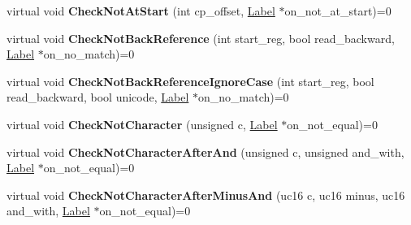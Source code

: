 \begin{DoxyCompactItemize}
\item 
virtual void {\bfseries Check\+Not\+At\+Start} (int cp\+\_\+offset, \hyperlink{classv8_1_1internal_1_1_label}{Label} $\ast$on\+\_\+not\+\_\+at\+\_\+start)=0\hypertarget{classv8_1_1internal_1_1_reg_exp_macro_assembler_a12b0a00f2d90487e6eccc9559f45a104}{}\label{classv8_1_1internal_1_1_reg_exp_macro_assembler_a12b0a00f2d90487e6eccc9559f45a104}

\item 
virtual void {\bfseries Check\+Not\+Back\+Reference} (int start\+\_\+reg, bool read\+\_\+backward, \hyperlink{classv8_1_1internal_1_1_label}{Label} $\ast$on\+\_\+no\+\_\+match)=0\hypertarget{classv8_1_1internal_1_1_reg_exp_macro_assembler_a3f57a3263201ff4724ee6504a079d72a}{}\label{classv8_1_1internal_1_1_reg_exp_macro_assembler_a3f57a3263201ff4724ee6504a079d72a}

\item 
virtual void {\bfseries Check\+Not\+Back\+Reference\+Ignore\+Case} (int start\+\_\+reg, bool read\+\_\+backward, bool unicode, \hyperlink{classv8_1_1internal_1_1_label}{Label} $\ast$on\+\_\+no\+\_\+match)=0\hypertarget{classv8_1_1internal_1_1_reg_exp_macro_assembler_a167317edcfc0cd3ef2326d7c08938875}{}\label{classv8_1_1internal_1_1_reg_exp_macro_assembler_a167317edcfc0cd3ef2326d7c08938875}

\item 
virtual void {\bfseries Check\+Not\+Character} (unsigned c, \hyperlink{classv8_1_1internal_1_1_label}{Label} $\ast$on\+\_\+not\+\_\+equal)=0\hypertarget{classv8_1_1internal_1_1_reg_exp_macro_assembler_ae8333c77adc1f824766f1b8450e7135d}{}\label{classv8_1_1internal_1_1_reg_exp_macro_assembler_ae8333c77adc1f824766f1b8450e7135d}

\item 
virtual void {\bfseries Check\+Not\+Character\+After\+And} (unsigned c, unsigned and\+\_\+with, \hyperlink{classv8_1_1internal_1_1_label}{Label} $\ast$on\+\_\+not\+\_\+equal)=0\hypertarget{classv8_1_1internal_1_1_reg_exp_macro_assembler_afca08e02faa3cddd9ab89ecd5505e28c}{}\label{classv8_1_1internal_1_1_reg_exp_macro_assembler_afca08e02faa3cddd9ab89ecd5505e28c}

\item 
virtual void {\bfseries Check\+Not\+Character\+After\+Minus\+And} (uc16 c, uc16 minus, uc16 and\+\_\+with, \hyperlink{classv8_1_1internal_1_1_label}{Label} $\ast$on\+\_\+not\+\_\+equal)=0\hypertarget{classv8_1_1internal_1_1_reg_exp_macro_assembler_a6ec10ec5fa6560fa42fc8c473774852d}{}\label{classv8_1_1internal_1_1_reg_exp_macro_assembler_a6ec10ec5fa6560fa42fc8c473774852d}


\end{DoxyCompactItemize}
